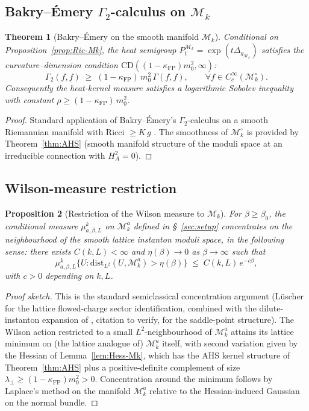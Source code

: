 \documentclass[11pt,a4paper]{amsart}
\newtheorem{theorem}{Theorem}[section]
\newtheorem{proposition}[theorem]{Proposition}
\theoremstyle{definition}
\newcommand{\Mmod}{\mathcal{M}}
\newcommand{\kFP}{\kappa_{\mathrm{FP}}}
\begin{document}
\subsection{Bakry--\'Emery $\Gamma_2$-calculus on $\Mmod_k$}

\begin{theorem}[Bakry--\'Emery on the smooth manifold $\Mmod_k$]
\label{thm:BE-Mk}
Conditional on Proposition~\ref{prop:Ric-Mk}, the heat semigroup
$P_t^{\Mmod_k} = \exp(t\Delta_{g_{\Mmod_k}})$ satisfies the
curvature--dimension condition $\mathrm{CD}((1-\kFP)m_0^2, \infty)$:
$$
\Gamma_2(f,f) \;\geq\; (1-\kFP)\,m_0^2 \,\Gamma(f,f),
\qquad \forall f \in C_c^\infty(\Mmod_k^\circ).
$$
Consequently the heat-kernel measure satisfies a logarithmic Sobolev
inequality with constant $\rho \geq (1-\kFP)\,m_0^2$.
\end{theorem}
\begin{proof}
Standard application of Bakry--\'Emery's $\Gamma_2$-calculus on a
smooth Riemannian manifold with Ricci $\geq K\,g$
\cite{BakryEmery1985,BakryGentilLedoux2014}. The smoothness of
$\Mmod_k^\circ$ is provided by Theorem~\ref{thm:AHS} (smooth manifold
structure of the moduli space at an irreducible connection with
$H^2_A=0$).
\end{proof}

\subsection{Wilson-measure restriction}

\begin{proposition}[Restriction of the Wilson measure to $\Mmod_k$]
\label{prop:mu-restrict}
For $\beta\geq\beta_0$, the conditional measure $\mu^k_{a,\beta,L}$
on $\Mmod_k^a$ defined in \S~\ref{sec:setup} concentrates on the
neighbourhood of the smooth lattice instanton moduli space, in the
following sense: there exists $C(k,L) < \infty$ and $\eta(\beta) \to 0$
as $\beta\to\infty$ such that
$$
\mu^k_{a,\beta,L}\{U : \mathrm{dist}_{L^2}(U,\Mmod_k^a) > \eta(\beta)\}
\;\leq\; C(k,L)\,e^{-c\beta},
$$
with $c > 0$ depending on $k,L$.
\end{proposition}
\begin{proof}[Proof sketch]
This is the standard semiclassical concentration argument
(L\"uscher~\cite{Luscher2010WilsonFlow} for the lattice flowed-charge
sector identification, combined with the dilute-instanton expansion of
\cite{Polyakov1977}, citation to verify, for the saddle-point structure).
The Wilson action restricted to a small $L^2$-neighbourhood of $\Mmod_k^a$
attains its lattice minimum on (the lattice analogue of) $\Mmod_k^a$
itself, with second variation given by the Hessian of
Lemma~\ref{lem:Hess-Mk}, which has the AHS kernel structure of
Theorem~\ref{thm:AHS} plus a positive-definite complement of size
$\lambda_\perp \geq (1-\kFP)m_0^2 > 0$. Concentration around the
minimum follows by Laplace's method on the manifold $\Mmod_k^a$
relative to the Hessian-induced Gaussian on the normal bundle.
\end{proof}
\end{document}
